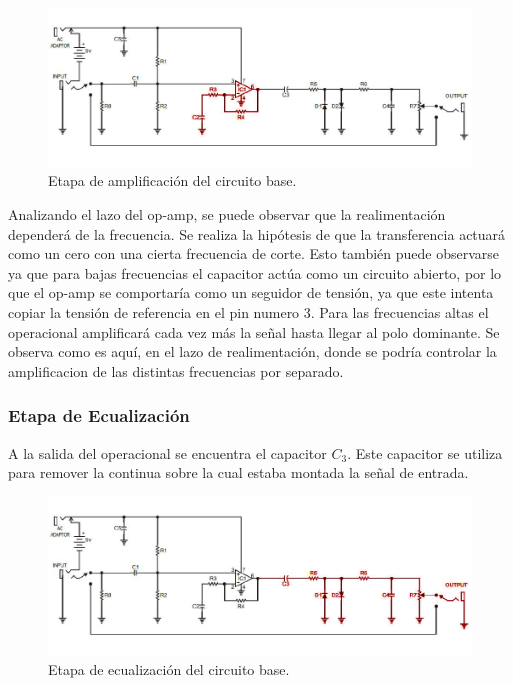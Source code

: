 \begin{figure}[H]
	\centering
	\includegraphics[width=1\textwidth, trim={0 0 0 0}, clip]{Ejercicio5/Imagenes/circuito_base_amplificacion.png}
	\caption{Etapa de amplificación del circuito base.}
	\label{fig:circuito_base_amplificacion}
\end{figure}

Analizando el lazo del op-amp, se puede observar que la realimentación dependerá de la frecuencia. Se realiza la hipótesis de que la transferencia actuará como un cero con una cierta frecuencia de corte. Esto también puede observarse ya que para bajas frecuencias el capacitor actúa como un circuito abierto, por lo que el op-amp se comportaría como un seguidor de tensión, ya que este intenta copiar la tensión de referencia en el pin numero 3. Para las frecuencias altas el operacional amplificará cada vez más la señal hasta llegar al polo dominante. Se observa como es aquí, en el lazo de realimentación, donde se podría controlar la amplificacion de las distintas frecuencias por separado.

\subsubsection{Etapa de Ecualización}

A la salida del operacional se encuentra el capacitor $C_3$. Este capacitor se utiliza para remover la continua sobre la cual estaba montada la señal de entrada.

\begin{figure}[H]
	\centering
	\includegraphics[width=1\textwidth, trim={0 0 0 0}, clip]{Ejercicio5/Imagenes/circuito_base_ecualizacion.png}
	\caption{Etapa de ecualización del circuito base.}
	\label{fig:circuito_base_ecualizacion}
\end{figure}

